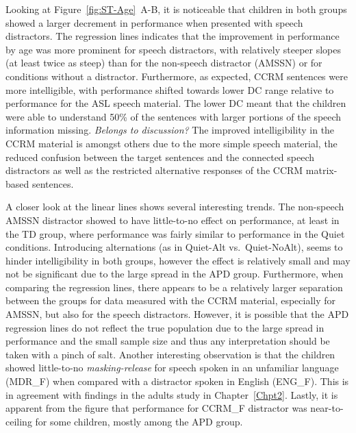 \documentclass[a4paper, twoside]{templates/ociamthesis}
\begin{document}
Looking at Figure~\ref{fig:ST-Age}~A-B, it is noticeable that children in both groups showed a larger decrement in performance when presented with speech distractors. The regression lines indicates that the improvement in performance by age was more prominent for speech distractors, with relatively steeper slopes (at least twice as steep) than for the non-speech distractor (AMSSN) or for conditions without a distractor. Furthermore, as expected, CCRM sentences were more intelligible, with performance shifted towards lower DC range relative to performance for the ASL speech material. The lower DC meant that the children were able to understand 50\% of the sentences with larger portions of the speech information missing. \colorbox[HTML]{CCCCFF}{\emph{Belongs to discussion?}} The improved intelligibility in the CCRM material is amongst others due to the more simple speech material, the reduced confusion between the target sentences and the connected speech distractors as well as the restricted alternative responses of the CCRM matrix-based sentences.

A closer look at the linear lines shows several interesting trends. The non-speech AMSSN distractor showed to have little-to-no effect on performance, at least in the TD group, where performance was fairly similar to performance in the Quiet conditions. Introducing alternations (as in Quiet-Alt vs.~Quiet-NoAlt), seems to hinder intelligibility in both groups, however the effect is relatively small and may not be significant due to the large spread in the APD group. Furthermore, when comparing the regression lines, there appears to be a relatively larger separation between the groups for data measured with the CCRM material, especially for AMSSN, but also for the speech distractors. However, it is possible that the APD regression lines do not reflect the true population due to the large spread in performance and the small sample size and thus any interpretation should be taken with a pinch of salt. Another interesting observation is that the children showed little-to-no \emph{masking-release} for speech spoken in an unfamiliar language (MDR\_F) when compared with a distractor spoken in English (ENG\_F). This is in agreement with findings in the adults study in Chapter~\ref{Chpt2}. Lastly, it is apparent from the figure that performance for CCRM\_F distractor was near-to-ceiling for some children, mostly among the APD group.\\
\end{document}

